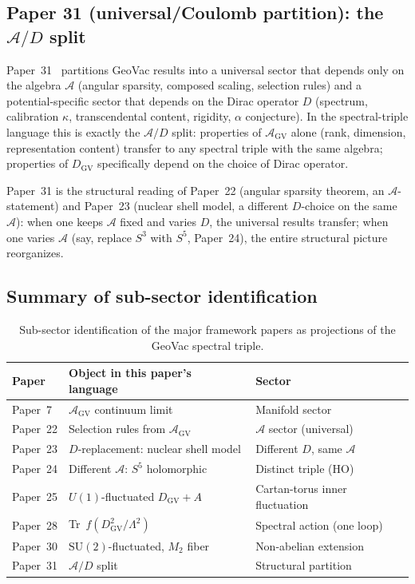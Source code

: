 \documentclass[11pt]{article}
\begin{document}
\subsection{Paper 31 (universal/Coulomb partition): the
$\mathcal{A}/D$ split}

Paper~31~\cite{paper31} partitions GeoVac results into a universal
sector that depends only on the algebra $\mathcal{A}$ (angular
sparsity, composed scaling, selection rules) and a potential-specific
sector that depends on the Dirac operator $D$ (spectrum, calibration
$\kappa$, transcendental content, rigidity, $\alpha$ conjecture).  In
the spectral-triple language this is exactly the $\mathcal{A}/D$ split:
properties of $\mathcal{A}_{\mathrm{GV}}$ alone (rank, dimension,
representation content) transfer to any spectral triple with the same
algebra; properties of $D_{\mathrm{GV}}$ specifically depend on the
choice of Dirac operator.

Paper~31 is the structural reading of Paper~22 (angular sparsity
theorem, an $\mathcal{A}$-statement) and Paper~23 (nuclear shell
model, a different $D$-choice on the same $\mathcal{A}$): when one
keeps $\mathcal{A}$ fixed and varies $D$, the universal results
transfer; when one varies $\mathcal{A}$ (say, replace $S^3$ with
$S^5$, Paper~24), the entire structural picture reorganizes.

\subsection{Summary of sub-sector identification}

\begin{table}[h]
\centering
\begin{tabular}{lll}
\toprule
Paper & Object in this paper's language & Sector \\
\midrule
Paper~7 & $\mathcal{A}_{\mathrm{GV}}$ continuum limit & Manifold sector \\
Paper~22 & Selection rules from $\mathcal{A}_{\mathrm{GV}}$ & $\mathcal{A}$ sector (universal) \\
Paper~23 & $D$-replacement: nuclear shell model & Different $D$, same $\mathcal{A}$ \\
Paper~24 & Different $\mathcal{A}$: $S^5$ holomorphic & Distinct triple (HO) \\
Paper~25 & $U(1)$-fluctuated $D_{\mathrm{GV}} + A$ & Cartan-torus inner fluctuation \\
Paper~28 & Tr~$f(D_{\mathrm{GV}}^2/\Lambda^2)$ & Spectral action (one loop) \\
Paper~30 & $\mathrm{SU}(2)$-fluctuated, $M_2$ fiber & Non-abelian extension \\
Paper~31 & $\mathcal{A}/D$ split & Structural partition \\
\bottomrule
\end{tabular}
\caption{Sub-sector identification of the major framework papers as
projections of the GeoVac spectral triple.}
\label{tab:subsectors}
\end{table}
\end{document}

